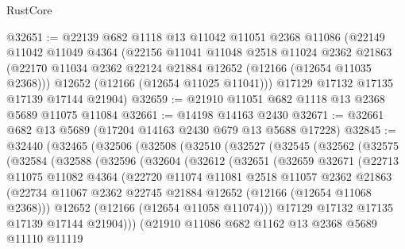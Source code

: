 \begin{lexlean}{RustCore}
\begin{coremodule}
@32651 := @22139
    @682
    @1118
    @13
    @11042
    @11051
    @2368
    @11086
    (@22149
      @11042
      @11049
      @4364
      (@22156
        @11041
        @11048
        @2518
        @11024
        @2362
        @21863
        (@22170 @11034 @2362 @22124 @21884 @12652 (@12166 (@12654 @11035 @2368)))
        @12652
        (@12166 (@12654 @11025 @11041)))
      @17129
      @17132
      @17135
      @17139
      @17144
      @21904)
@32659 := @21910 @11051 @682 @1118 @13 @2368 @5689 @11075 @11084
@32661 := @14198 @14163 @2430
@32671 := @32661 @682 @13 @5689 (@17204 @14163 @2430 @679 @13 @5688 @17228)
@32845 := @32440
    (@32465
      (@32506
        (@32508
          (@32510
            (@32527
              (@32545
                (@32562
                  (@32575
                    (@32584
                      (@32588
                        (@32596
                          (@32604
                            (@32612
                              (@32651
                                (@32659
                                  @32671
                                  (@22713
                                    @11075
                                    @11082
                                    @4364
                                    (@22720
                                      @11074
                                      @11081
                                      @2518
                                      @11057
                                      @2362
                                      @21863
                                      (@22734
                                        @11067
                                        @2362
                                        @22745
                                        @21884
                                        @12652
                                        (@12166 (@12654 @11068 @2368)))
                                      @12652
                                      (@12166 (@12654 @11058 @11074)))
                                    @17129
                                    @17132
                                    @17135
                                    @17139
                                    @17144
                                    @21904)))
                              (@21910
                                @11086
                                @682
                                @1162
                                @13
                                @2368
                                @5689
                                @11110
                                @11119

\end{coremodule}
\end{lexlean}

